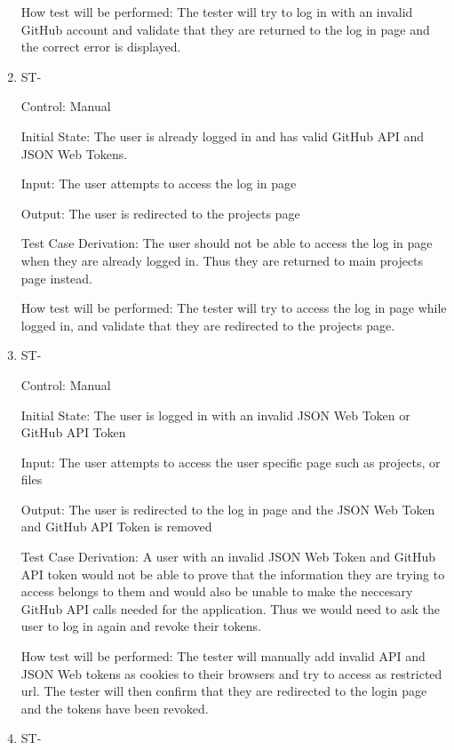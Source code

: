 \documentclass[12pt, titlepage]{article}
\newcounter{TESTID}
\newcommand\TESTNUM{\stepcounter{TESTID}\theTESTID}
\begin{document}
\begin{enumerate}
		How test will be performed: The tester will try to log in with an invalid GitHub account and validate that they are returned to the log in page and the correct error is displayed.
		
		\item{ST-\TESTNUM\\}
		
		Control: Manual
		
		Initial State: The user is already logged in and has valid GitHub API and JSON Web Tokens.
		
		Input: The user attempts to access the log in page
		
		Output: The user is redirected to the projects page
		
		Test Case Derivation: The user should not be able to access the log in page when they are already logged in. Thus they are returned to main projects page instead.
		
		How test will be performed: The tester will try to access the log in page while logged in, and validate that they are redirected to the projects page.
		
		\item{ST-\TESTNUM\\}
		
		Control: Manual
		
		Initial State: The user is logged in with an invalid JSON Web Token or GitHub API Token
		
		Input: The user attempts to access the user specific page such as projects, or files
		
		Output: The user is redirected to the log in page and the JSON Web Token and GitHub API Token is removed
		
		Test Case Derivation: A user with an invalid JSON Web Token and GitHub API token would not be able to prove that the information they are trying to access belongs to them and would also be unable to make the neccesary GitHub API calls needed for the application. Thus we would need to ask the user to log in again and revoke their tokens.
		
		How test will be performed: The tester will manually add invalid API and JSON Web tokens as cookies to their browsers and try to access as restricted url. The tester will then confirm that they are redirected to the login page and the tokens have been revoked.
		
		\item{ST-\TESTNUM\\}
		

\end{enumerate}
\end{document}

